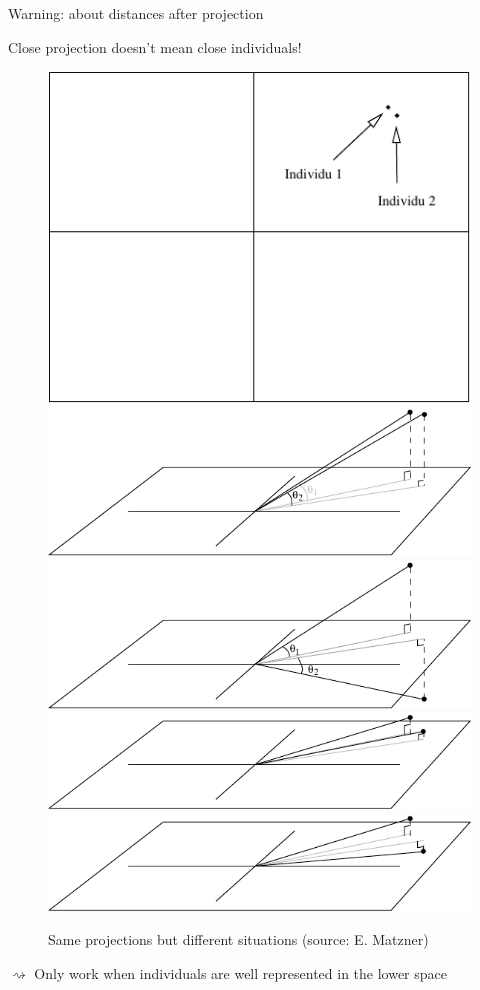 \documentclass{beamer}\usepackage[]{graphicx}\usepackage[]{color}
\begin{document}
\begin{frame}{Warning: about distances after projection}

  \alert{Close projection doesn't mean close individuals!}

  \begin{figure}
    \includegraphics[width = .35\textwidth]{plan_indiv_proche}\\[1ex]
    \includegraphics[width = .35\textwidth]{plan_3d_proche}
    \includegraphics[width = .35\textwidth]{plan_3d_eloigne}
    \includegraphics[width = .35\textwidth]{plan_3d_proche2}
    \includegraphics[width = .35\textwidth]{plan_3d_eloigne2}
    \caption{Same projections but different situations {\tiny (source: E. Matzner)}}

  \end{figure}

 $\rightsquigarrow$ Only work when individuals are well represented in the lower space
\end{frame}
\end{document}
